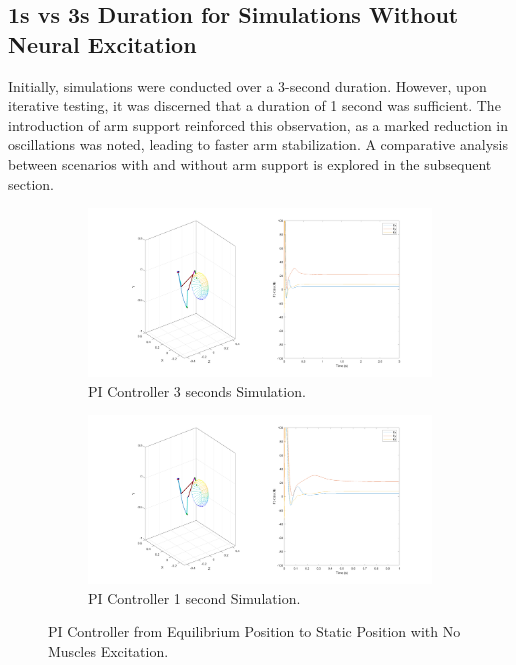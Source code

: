 \subsection{1s vs 3s Duration for Simulations Without Neural Excitation}

Initially, simulations were conducted over a 3-second duration. However, upon iterative testing, it was discerned that a duration of 1 second was sufficient. The introduction of arm support reinforced this observation, as a marked reduction in oscillations was noted, leading to faster arm stabilization. A comparative analysis between scenarios with and without arm support is explored in the subsequent section.

\begin{figure}[h!] 
    \centering
    \begin{subfigure}[b]{0.8\linewidth}
       \includegraphics[width=\linewidth]{Pictures/Results/3s_NoNeuralExcitation.png}
        \caption{PI Controller 3 seconds Simulation.}
    \end{subfigure}

    \vspace{1cm} %
    \begin{subfigure}[b]{0.8\linewidth}            
        \includegraphics[width=\linewidth]{Pictures/Results/1s_NoNeuralExcitation.png}
        \caption{PI Controller 1 second Simulation.}
    \end{subfigure}

    \caption{PI Controller from Equilibrium Position to Static Position with No Muscles Excitation.}

\end{figure}

